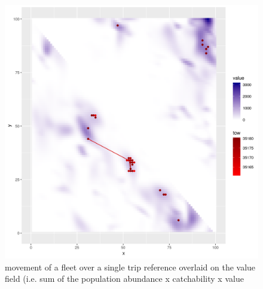 \documentclass[review]{elsarticle}
\begin{document}
\begin{figure}[!ht]
	\includegraphics[width = \linewidth]{Plots/vessel_move_value}
	\caption{movement of a fleet over a single trip reference overlaid on the
		value field (i.e. sum of the population abundance x catchability x value}
	\label{fig:13}
\end{figure}	
\end{document}
